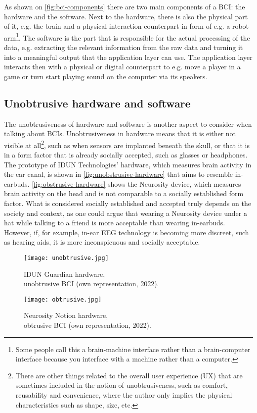 As shown on \autoref{fig:bci-components} there are two main components of a BCI: the hardware and the software. Next to the hardware, there is also the physical part of it, e.g. the brain and a physical interaction counterpart in form of e.g. a robot arm\footnote{Some people call this a brain-machine interface rather than a brain-computer interface because you interface with a machine rather than a computer.}. The software is the part that is responsible for the actual processing of the data, e.g. extracting the relevant information from the raw data and turning it into a meaningful output that the application layer can use. The application layer interacts then with a physical or digital counterpart to e.g. move a player in a game or turn start playing sound on the computer via its speakers.

\subsection{Unobtrusive hardware and software}
\label{chapter2-unobtrusive-hardware-and-software}

The unobtrusiveness of hardware and software is another aspect to consider when talking about BCIs. Unobtrusiveness in hardware means that it is either not visible at all\footnote{There are other things related to the overall user experience (UX) that are sometimes included in the notion of unobtrusiveness, such as comfort, reusability and convenience, where the author only implies the physical characteristics such as shape, size, etc.}, such as when sensors are implanted beneath the skull, or that it is in a form factor that is already socially accepted, such as glasses or headphones. The prototype of IDUN Technologies' hardware, which measures brain activity in the ear canal, is shown in \autoref{fig:unobstrusive-hardware} that aims to resemble in-earbuds. \autoref{fig:obstrusive-hardware} shows the Neurosity device, which measures brain activity on the head and is not comparable to a socially established form factor. What is considered socially established and accepted truly depends on the society and context, as one could argue that wearing a Neurosity device under a hat while talking to a friend is more acceptable than wearing in-earbuds. However, if, for example, in-ear EEG technology is becoming more discreet, such as hearing aids, it is more inconspicuous and socially acceptable.

\begin{figure}[!htb]
  \texttt{[image: unobtrusive.jpg]}
  \caption{IDUN Guardian hardware, \\ unobtrusive BCI (own representation, 2022).}
  \label{fig:unobstrusive-hardware}
  \endminipage\hfill
  \texttt{[image: obtrusive.jpg]}
  \caption{Neurosity Notion hardware, \\ obtrusive BCI (own representation, 2022).}
  \label{fig:obstrusive-hardware}
  \endminipage\hfill
\end{figure}

